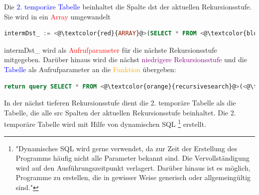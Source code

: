 Die \textcolor{blue}{2. temporäre Tabelle} beinhaltet die Spalte dst der aktuellen Rekursionsstufe. Sie wird in ein \textcolor{red}{Array}
 umgewandelt
\begin{lstlisting}[language=SQL,caption = Erstellen des Aufrufarray,frame=single, label={AbbruchbedingungRecursiveSearch} ]
intermDst_ := <@\textcolor{red}{ARRAY}@>(SELECT * FROM <@\textcolor{blue}{intermDst1}@>);
\end{lstlisting}
intermDst\_ wird als \textcolor{red}{Aufrufparameter} für die nächste Rekursionsstufe mitgegeben. Darüber hinaus wird die nächst \textcolor{purple}{niedrigere Rekursionsstufe} und die
\textcolor{blue}{Tabelle} als Aufrufparameter an die \textcolor{orange}{Funktion} übergeben:
\begin{lstlisting}[language=SQL,caption = Aufrufen der nächst tieferen Rekursionsstufe,frame=single, label={AbbruchbedingungRecursiveSearch} ]
return query SELECT * FROM <@\textcolor{orange}{recursivesearch}@>(<@\textcolor{red}{intermDst\_}@>, <@\textcolor{purple}{iRecursionDepth - 1}@>, <@\textcolor{blue}{sTable}@>);
\end{lstlisting}
In der nächst tieferen Rekursionsstufe dient die 2. temporäre Tabelle als die Tabelle, die alle
src Spalten der aktuellen Rekursionsstufe beinhaltet. Die 2. temporäre Tabelle wird mit Hilfe von dynamischen \ac{SQL} \footnote{"Dynamisches SQL wird gerne verwendet,
da zur Zeit der Erstellung des Programms häufig nicht alle Parameter bekannt sind. Die Vervollständigung wird auf den Ausführungszeitpunkt verlagert. Darüber hinaus
ist es möglich, Programme zu erstellen, die in gewisser Weise generisch oder allgemeingültig sind."\cite[S.316 - 317]{froehlich01}} erstellt.

